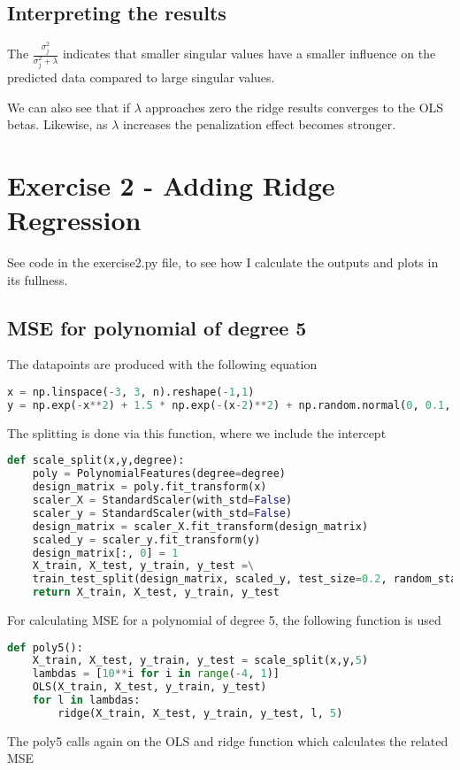 \documentclass{article}
\begin{document}
\subsection*{Interpreting the results}
The $\frac{\sigma_{j}^{2}}{\sigma_{j}^2 + \lambda}$ indicates that smaller 
singular values have a smaller influence on the predicted data compared to large singular values.

We can also see that if $\lambda$ approaches zero the ridge results converges to the OLS betas. Likewise,
as $\lambda$ increases the penalization effect becomes stronger.




\section*{Exercise 2 - Adding Ridge Regression}
See code in the exercise2.py file, to see how I calculate the outputs and plots in its fullness.  
\subsection*{MSE for polynomial of degree 5}
The datapoints are produced with the following equation
\begin{lstlisting}[language=Python] 
x = np.linspace(-3, 3, n).reshape(-1,1) 
y = np.exp(-x**2) + 1.5 * np.exp(-(x-2)**2) + np.random.normal(0, 0.1, x.shape)
\end{lstlisting}
The splitting is done via this function, where we include the intercept
\begin{lstlisting}[language=Python] 
def scale_split(x,y,degree):
    poly = PolynomialFeatures(degree=degree) 
    design_matrix = poly.fit_transform(x)
    scaler_X = StandardScaler(with_std=False)
    scaler_y = StandardScaler(with_std=False)
    design_matrix = scaler_X.fit_transform(design_matrix)
    scaled_y = scaler_y.fit_transform(y)
    design_matrix[:, 0] = 1
    X_train, X_test, y_train, y_test =\
    train_test_split(design_matrix, scaled_y, test_size=0.2, random_state=42)
    return X_train, X_test, y_train, y_test 
\end{lstlisting}
For calculating MSE for a polynomial of degree 5, the following function is used
\begin{lstlisting}[language=Python]
def poly5():
    X_train, X_test, y_train, y_test = scale_split(x,y,5)
    lambdas = [10**i for i in range(-4, 1)]
    OLS(X_train, X_test, y_train, y_test)
    for l in lambdas:
        ridge(X_train, X_test, y_train, y_test, l, 5)
\end{lstlisting}
The poly5 calls again on the OLS and ridge function which calculates the related MSE
\end{document}
